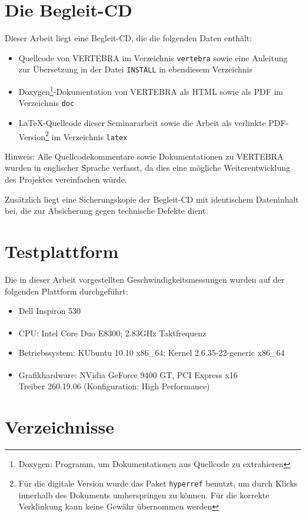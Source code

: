\documentclass[pdftex,a4paper,titlepage,12pt]{scrartcl}
\newtheorem[L]{boxedDefinition}{Definition}
\begin{document}
\section{Die Begleit-CD}
Dieser Arbeit liegt eine Begleit-CD, die die folgenden Daten enthält:
\begin{itemize}
 \item Quellcode von VERTEBRA im Verzeichnis \texttt{vertebra} sowie eine Anleitung zur Übersetzung in der Datei \texttt{INSTALL} in ebendiesem Verzeichnis
 \item Doxygen\footnote{Doxygen: Programm, um Dokumentationen aus Quellcode zu extrahieren}-Dokumentation von VERTEBRA als HTML sowie als PDF im Verzeichnis \texttt{doc}
 \item \LaTeX-Quellcode dieser Seminararbeit sowie die Arbeit als verlinkte PDF-Version\footnote{Für die digitale Version wurde das Paket \texttt{hyperref} benutzt, um durch Klicks innerhalb des Dokuments umherspringen zu können. Für die korrekte Verklinkung kann keine Gewähr übernommen werden} im Verzeichnis \texttt{latex} 
\end{itemize}

Hinweis: Alle Quellcodekommentare sowie Dokumentationen zu VERTEBRA wurden in englischer Sprache verfasst, da dies eine mögliche Weiterentwicklung des Projektes vereinfachen würde.

Zusätzlich liegt eine Sicherungskopie der Begleit-CD mit identischem Dateninhalt bei, die zur Absicherung gegen technische Defekte dient.

\section{Testplattform}\label{apdx:testplatform}
Die in dieser Arbeit vorgestellten Geschwindigkeitsmessungen wurden auf der folgenden Plattform durchgeführt:
\begin{itemize}
  \item Dell Inspiron 530
  \item CPU: Intel\textsuperscript{\textregistered} Core Duo E8300; 2.83GHz Taktfrequenz
  \item Betriebssystem: KUbuntu 10.10 x86\_64; Kernel 2.6.35-22-generic x86\_64
  \item Grafikhardware: NVidia\textsuperscript{\textregistered} GeForce 9400 GT, PCI Express x16\\
	Treiber 260.19.06 (Konfiguration: High Performance)
\end{itemize}
\newpage
\section{Verzeichnisse}
\listoffigures
\renewcommand\refname{Literatur- und Quellenverzeichnis}


\clearpage
\end{document}
